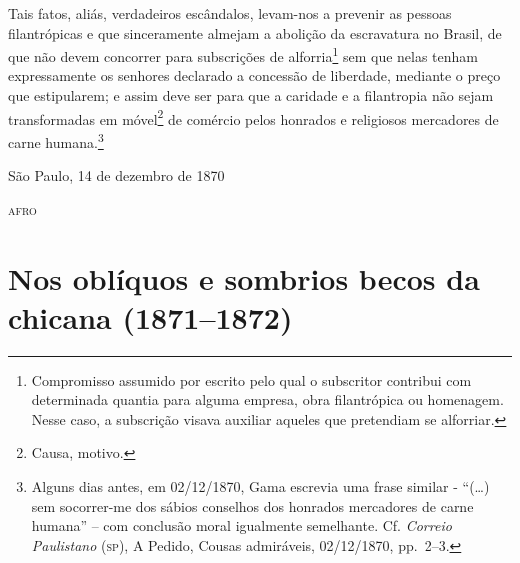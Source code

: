 {Tais fatos, aliás, verdadeiros escândalos, levam-nos a prevenir as
pessoas filantrópicas e que sinceramente almejam a abolição da
escravatura no Brasil, de que não devem concorrer para subscrições de
alforria\footnote{ Compromisso assumido por escrito pelo qual o
  subscritor contribui com determinada quantia para alguma empresa, obra
  filantrópica ou homenagem. Nesse caso, a subscrição visava auxiliar
  aqueles que pretendiam se alforriar.} sem que nelas tenham
expressamente os senhores declarado a concessão de liberdade, mediante o
preço que estipularem; e assim deve ser para que a caridade e a
filantropia não sejam transformadas em móvel\footnote{ Causa, motivo.}
de comércio pelos honrados e religiosos mercadores de carne
humana.\footnote{ Alguns dias antes, em 02/12/1870, Gama escrevia uma
  frase similar - ``(\ldots{}) sem socorrer-me dos sábios conselhos dos
  honrados mercadores de carne humana'' -- com conclusão moral igualmente
  semelhante. Cf. \emph{Correio Paulistano} (\textsc{sp}), A Pedido, Cousas
  admiráveis, 02/12/1870, pp.~2--3.}

\begin{flushright}
São Paulo, 14 de dezembro de 1870

\textsc{afro}
\end{flushright}

\part{Nos oblíquos e sombrios becos da chicana (1871--1872)}

}
